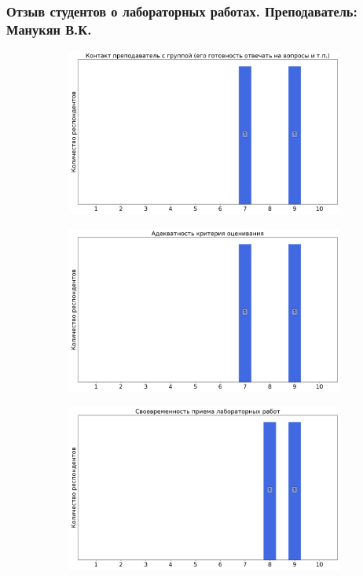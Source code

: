     \subsubsection{Отзыв студентов о лабораторных работах. Преподаватель: Манукян В.К.}
		\begin{figure}[H]
			\centering
			\begin{subfigure}[b]{0.45\textwidth}
				\centering
				\includegraphics[width=\textwidth]{images/3 course/Радиофизическая лаборатория/labniks-marks-Манукян В.К.-0.png}
			\end{subfigure}
			\begin{subfigure}[b]{0.45\textwidth}
				\centering
				\includegraphics[width=\textwidth]{images/3 course/Радиофизическая лаборатория/labniks-marks-Манукян В.К.-1.png}
			\end{subfigure}
			\begin{subfigure}[b]{0.45\textwidth}
				\centering
				\includegraphics[width=\textwidth]{images/3 course/Радиофизическая лаборатория/labniks-marks-Манукян В.К.-2.png}

\end{subfigure}
\end{figure}
